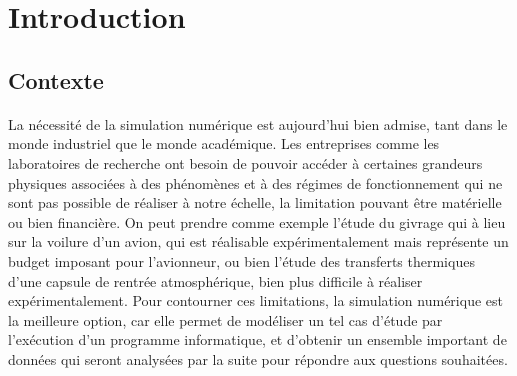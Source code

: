 

\maketitle

\section{Introduction}

	\subsection{Contexte}

		\paragraph{}
		La nécessité de la simulation numérique est aujourd'hui bien admise, tant dans le monde industriel que le monde académique.
		Les entreprises comme les laboratoires de recherche ont besoin de pouvoir accéder à certaines grandeurs physiques associées à des phénomènes et à des régimes de fonctionnement qui ne sont pas possible de réaliser à notre échelle, la limitation pouvant être matérielle ou bien financière.
		On peut prendre comme exemple l'étude du givrage qui à lieu sur la voilure d'un avion, qui est réalisable expérimentalement mais représente un budget imposant pour l’avionneur, ou bien l'étude des transferts thermiques d'une capsule de rentrée atmosphérique, bien plus difficile à réaliser expérimentalement.
		Pour contourner ces limitations, la simulation numérique est la meilleure option, car elle permet de modéliser un tel cas d'étude par l’exécution d'un programme informatique, et d'obtenir un ensemble important de données qui seront analysées par la suite pour répondre aux questions souhaitées.

